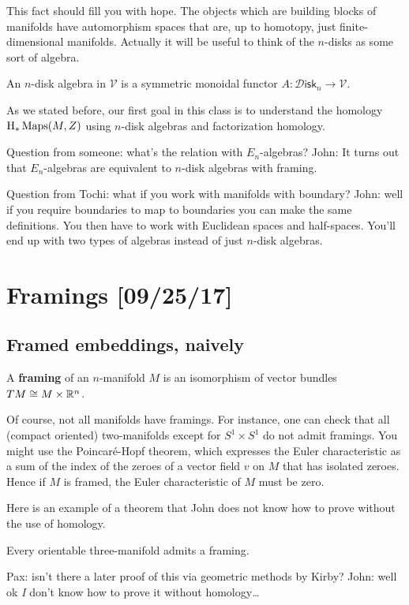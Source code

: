 \documentclass{amsart}
\begin{document}
This fact should fill you with hope. The objects which are building blocks of manifolds
have automorphism spaces that are, up to homotopy, just finite-dimensional manifolds.
Actually it will be useful to think of the $n$-disks as some sort of algebra.

\begin{definition}
    An $n$-disk algebra in $\mathcal{V}$ is a symmetric monoidal functor
    $A:\mathcal{D}\mathsf{isk}_n\to\mathcal{V}$.
\end{definition}

As we stated before, our first goal in this class is to understand the homology 
$\operatorname{H}_*\operatorname{Maps}(M,Z)$ using $n$-disk algebras and factorization homology.

Question from someone: what's the relation with $E_n$-algebras? John: It turns
out that $E_n$-algebras are equivalent to $n$-disk algebras with framing.

Question from Tochi: what if you work with manifolds with boundary? John: well
if you require boundaries to map to boundaries you can make the same definitions.
You then have to work with Euclidean spaces and half-spaces. You'll end up
with two types of algebras instead of just $n$-disk algebras.

\newpage
\section{Framings [09/25/17]}

\subsection{Framed embeddings, naively}

\begin{definition}
    A \textbf{framing} of an $n$-manifold $M$ is an isomorphism of vector bundles
    $TM \cong M\times \mathbb{R}^n$.
\end{definition}

Of course, not all manifolds have framings. For instance, one
can check that all (compact oriented) two-manifolds except for $S^1\times S^1$ do not admit framings.
You might use the Poincar\'e-Hopf theorem, which expresses the Euler characteristic
as a sum of the index of the zeroes of a vector field $v$ on $M$ that has isolated
zeroes. Hence if $M$ is framed, the Euler characteristic of $M$ must be zero.

Here is an example of a theorem that John does not know how to prove without the use of homology.
\begin{theorem}[Whitney or Wu]
    Every orientable three-manifold admits a framing.
\end{theorem}
Pax: isn't there a later proof of this via geometric methods by Kirby? John: well ok
\textit{I} don't know how to prove it without homology\ldots
\end{document}
